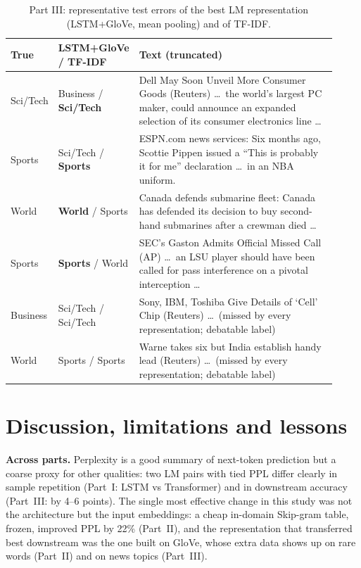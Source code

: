 \documentclass[10pt,a4paper]{article}
\begin{document}
\begin{table}[!htb]
\centering\small
\caption{Part III: representative test errors of the best LM representation (LSTM+GloVe, mean pooling)
and of TF-IDF.}
\label{tab:err}
\begin{tabular}{p{0.085\linewidth}p{0.15\linewidth}p{0.69\linewidth}}
\toprule
True & LSTM+GloVe / TF-IDF & Text (truncated)\\
\midrule
Sci/Tech & Business / \textbf{Sci/Tech} & Dell May Soon Unveil More Consumer Goods (Reuters) \ldots\ the world's largest PC maker, could announce an expanded selection of its consumer electronics line \ldots\\
Sports & Sci/Tech / \textbf{Sports} & ESPN.com news services: Six months ago, Scottie Pippen issued a ``This is probably it for me'' declaration \ldots\ in an NBA uniform.\\
World & \textbf{World} / Sports & Canada defends submarine fleet: Canada has defended its decision to buy second-hand submarines after a crewman died \ldots\\
Sports & \textbf{Sports} / World & SEC's Gaston Admits Official Missed Call (AP) \ldots\ an LSU player should have been called for pass interference on a pivotal interception \ldots\\
Business & Sci/Tech / Sci/Tech & Sony, IBM, Toshiba Give Details of `Cell' Chip (Reuters) \ldots\ (missed by every representation; debatable label)\\
World & Sports / Sports & Warne takes six but India establish handy lead (Reuters) \ldots\ (missed by every representation; debatable label)\\
\bottomrule
\end{tabular}
\end{table}

\section{Discussion, limitations and lessons}
\textbf{Across parts.} Perplexity is a good summary of next-token prediction but a coarse proxy for other
qualities: two LM pairs with tied PPL differ clearly in sample repetition (Part~I: LSTM vs Transformer) and in
downstream accuracy (Part~III: by 4--6 points). The single most effective change in this study was not the
architecture but the input embeddings: a cheap in-domain Skip-gram table, frozen, improved PPL by 22\% (Part~II),
and the representation that transferred best downstream was the one built on GloVe, whose extra data shows up
on rare words (Part~II) and on news topics (Part~III).
\end{document}
